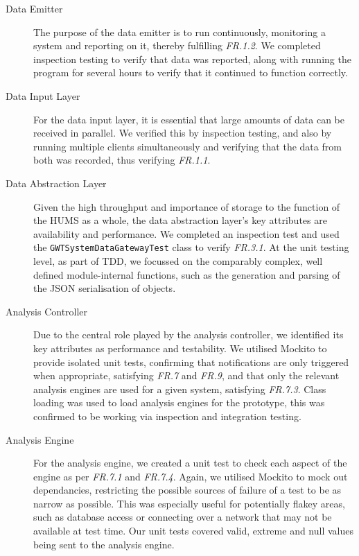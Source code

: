 \documentclass[10pt,a4paper]{article}
\newcommand{\frit}[1]{\textit{FR.#1}}
\begin{document}
\begin{description}

  \item[Data Emitter] The purpose of the data emitter is to run
    continuously, monitoring a system and reporting on it, thereby
    fulfilling \frit{1.2}. We completed inspection testing to verify 
    that data was reported, along with running the program for 
    several hours to verify that it continued to function correctly.

  \item[Data Input Layer] For the data input layer, it is essential that large
    amounts of data can be received in parallel. We verified this by
    inspection testing, and also by running multiple clients simultaneously and
    verifying that the data from both was recorded, thus verifying \frit{1.1}.

  \item[Data Abstraction Layer] Given the high throughput and
    importance of storage to the function of the HUMS as a whole, the
    data abstraction layer's key attributes are availability and
    performance. We completed an inspection test and used the 
    \texttt{GWTSystemDataGatewayTest} class to verify \frit{3.1}. At the unit 
    testing level, as  part of TDD, we focussed on the comparably complex,
    well defined module-internal functions, such as the generation and 
    parsing of the JSON serialisation of objects.
    
  \item[Analysis Controller] Due to the central role played by the 
  analysis controller, we identified its key 
  attributes as performance and testability. We utilised Mockito to 
  provide isolated unit tests, confirming that notifications 
  are only triggered when appropriate, satisfying \frit{7} and \frit{9}, and 
  that only the relevant analysis engines are used for a given system, 
  satisfying \frit{7.3}. Class loading was used to load analysis engines for 
  the prototype, this was confirmed to be working via inspection and 
  integration testing.
  
  \item[Analysis Engine]
   For the analysis engine, we created a unit test to check each aspect of the 
   engine as per \frit{7.1} and \frit{7.4}. Again, we utilised Mockito to mock out
   dependancies, restricting the possible sources of failure of a test to be 
   as narrow as possible. This was especially useful for potentially flakey 
   areas, such as database access or connecting over a network that may 
   not be available at test time. Our unit tests covered valid, extreme and 
   null values being sent to the analysis engine.


\end{description}
\end{document}
